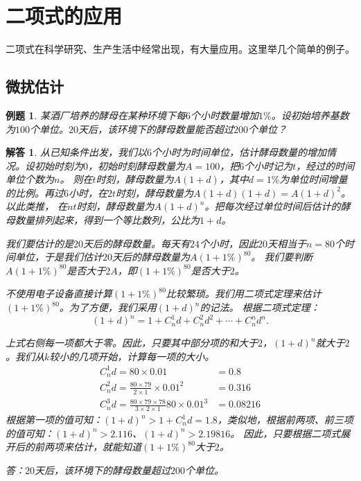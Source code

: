 \documentclass[12pt,UTF8]{ctexbook}
\newtheorem{et}{例题}[section]
\newtheorem*{so}{解答}
\begin{document}
\section{二项式的应用}

二项式在科学研究、生产生活中经常出现，有大量应用。这里举几个简单的例子。

\subsection{微扰估计}
\begin{et}
某酒厂培养的酵母在某种环境下每$6$个小时数量增加$1\%$。设初始培养基数为$100$个单位。$20$天后，该环境下的酵母数量能否超过$200$个单位？
\end{et}
\begin{so}  
    从已知条件出发，我们以$6$个小时为时间单位，估计酵母数量的增加情况。设初始时刻为$0$，初始时刻酵母数量为$A = 100$，把$6$个小时记为$t$，经过的时间单位个数为$n$。
    则在$t$时刻，酵母数量为$A(1 + d)$，其中$d=1\%$为单位时间增量的比例。再过$6$小时，在$2t$时刻，酵母数量为$A(1 + d)(1 + d) = A(1 + d)^2$。以此类推，
    在$nt$时刻，酵母数量为$A(1 + d)^n$。把每次经过单位时间后估计的酵母数量排列起来，得到一个等比数列，公比为$1 + d$。

    我们要估计的是$20$天后的酵母数量。每天有$24$个小时，因此$20$天相当于$n=80$个时间单位，于是我们估计$20$天后的酵母数量为$A(1 + 1\%)^{80}$。
    我们要判断$A(1 + 1\%)^{80}$是否大于$2A$，即$(1 + 1\%)^{80}$是否大于$2$。

    不使用电子设备直接计算$(1 + 1\%)^80$比较繁琐。我们用二项式定理来估计$(1 + 1\%)^{80}$。为了方便，我们采用$(1 + d)^n$的记法。
    根据二项式定理：
    $$(1 + d)^n = 1 + C_n^1 d + C_n^2 d^2 + \cdots + C_n^n d^n.$$
    
    上式右侧每一项都大于零。因此，只要其中部分项的和大于$2$，$(1 + d)^n$就大于$2$。我们从$k$较小的几项开始，计算每一项的大小。
    \begin{align*}
        C_n^1 d = 80 \times 0.01 &= 0.8  \\
        C_n^2 d = \frac{80 \times 79}{2\times 1} \times 0.01^2 &= 0.316  \\ 
        C_n^3 d = \frac{80 \times 79\times 78}{3\times 2\times 1}80 \times 0.01^3 &= 0.08216 
    \end{align*}
    根据第一项的值可知：$(1 + d)^n > 1 + C_n^1 d = 1.8$，类似地，根据前两项、前三项的值可知：$(1 + d)^n > 2.116$、$(1 + d)^n > 2.19816$。
    因此，只要根据二项式展开后的前两项来估计，就能知道$(1 + 1\%)^{80}$大于$2$。
    
    答：$20$天后，该环境下的酵母数量超过$200$个单位。
\end{so}
\end{document}
